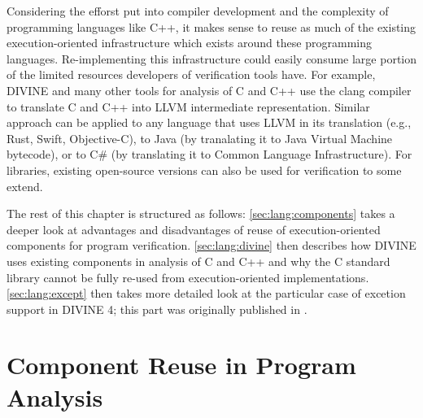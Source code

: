 Considering the efforst put into compiler development and the complexity of
programming languages like C++, it makes sense to reuse as much of the existing
execution-oriented infrastructure which exists around these programming
languages.
Re-implementing this infrastructure could easily consume large portion of the
limited resources developers of verification tools have.
For example, DIVINE and many other tools for analysis of C and C++ use the
clang compiler to translate C and C++ into LLVM intermediate representation.
Similar approach can be applied to any language that uses LLVM in its
translation (e.g., Rust, Swift, Objective-C), to Java (by tranalating it to
Java Virtual Machine bytecode), or to C\# (by translating it to Common Language
Infrastructure).
For libraries, existing open-source versions can also be used for verification to some extend.

The rest of this chapter is structured as follows: \autoref{sec:lang:components} takes a deeper look at advantages and disadvantages of reuse of execution-oriented components for program verification.
\autoref{sec:lang:divine} then describes how DIVINE uses existing components in analysis of C and C++ and why the C standard library cannot be fully re-used from execution-oriented implementations.
\autoref{sec:lang:except} then takes more detailed look at the particular case of excetion support in DIVINE 4; this part was originally published in .


\section{Component Reuse in Program Analysis}\label{sec:lang:components}

